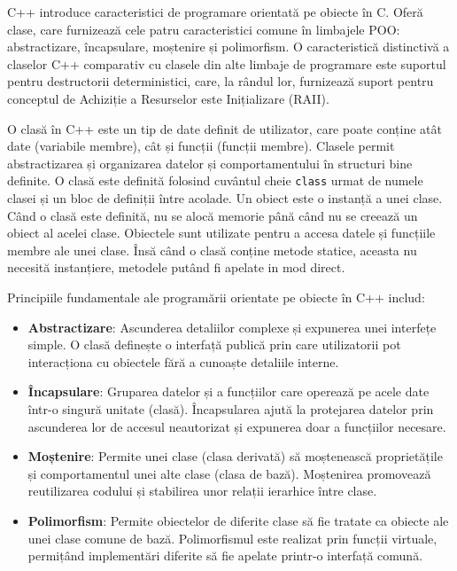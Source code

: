 \documentclass[a4paper,12pt]{report}
\begin{document}
C++ introduce caracteristici de programare orientată pe obiecte în C. Oferă clase, care furnizează cele patru caracteristici comune în limbajele POO: abstractizare, încapsulare, moștenire și polimorfism. O caracteristică distinctivă a claselor C++ comparativ cu clasele din alte limbaje de programare este suportul pentru destructorii deterministici, care, la rândul lor, furnizează suport pentru conceptul de Achiziție a Resurselor este Inițializare (RAII).

O clasă în C++ este un tip de date definit de utilizator, care poate conține atât date (variabile membre), cât și funcții (funcții membre). Clasele permit abstractizarea și organizarea datelor și comportamentului în structuri bine definite. O clasă este definită folosind cuvântul cheie \texttt{class} urmat de numele clasei și un bloc de definiții între acolade. Un obiect este o instanță a unei clase. Când o clasă este definită, nu se alocă memorie până când nu se creează un obiect al acelei clase. Obiectele sunt utilizate pentru a accesa datele și funcțiile membre ale unei clase. Însă când o clasă conține metode statice, aceasta nu necesită instanțiere, metodele putând fi apelate in mod direct.

Principiile fundamentale ale programării orientate pe obiecte în C++ includ:
\begin{itemize}
    \item \textbf{Abstractizare}: Ascunderea detaliilor complexe și expunerea unei interfețe simple. O clasă definește o interfață publică prin care utilizatorii pot interacționa cu obiectele fără a cunoaște detaliile interne.
    \item \textbf{Încapsulare}: Gruparea datelor și a funcțiilor care operează pe acele date într-o singură unitate (clasă). Încapsularea ajută la protejarea datelor prin ascunderea lor de accesul neautorizat și expunerea doar a funcțiilor necesare.
    \item \textbf{Moștenire}: Permite unei clase (clasa derivată) să moștenească proprietățile și comportamentul unei alte clase (clasa de bază). Moștenirea promovează reutilizarea codului și stabilirea unor relații ierarhice între clase.
    \item \textbf{Polimorfism}: Permite obiectelor de diferite clase să fie tratate ca obiecte ale unei clase comune de bază. Polimorfismul este realizat prin funcții virtuale, permițând implementări diferite să fie apelate printr-o interfață comună.
\end{itemize}
\end{document}

